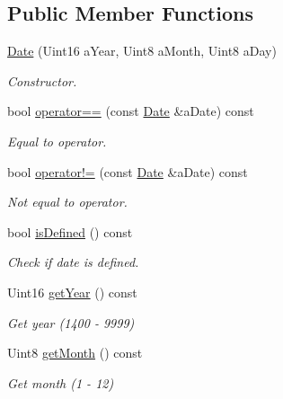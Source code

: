 \subsection*{Public Member Functions}
\begin{DoxyCompactItemize}
\item 
\hyperlink{classostk_1_1physics_1_1time_1_1_date_a3ff43a5f7a8ce8350e894b51befeb50d}{Date} (Uint16 a\+Year, Uint8 a\+Month, Uint8 a\+Day)
\begin{DoxyCompactList}\small\item\em Constructor. \end{DoxyCompactList}\item 
bool \hyperlink{classostk_1_1physics_1_1time_1_1_date_aeb81c9a588fb376cff125b5c7a6c102b}{operator==} (const \hyperlink{classostk_1_1physics_1_1time_1_1_date}{Date} \&a\+Date) const
\begin{DoxyCompactList}\small\item\em Equal to operator. \end{DoxyCompactList}\item 
bool \hyperlink{classostk_1_1physics_1_1time_1_1_date_a556e99ee4d580ef765e67e150193872e}{operator!=} (const \hyperlink{classostk_1_1physics_1_1time_1_1_date}{Date} \&a\+Date) const
\begin{DoxyCompactList}\small\item\em Not equal to operator. \end{DoxyCompactList}\item 
bool \hyperlink{classostk_1_1physics_1_1time_1_1_date_af73384bd32110f0b66214afd79b60b60}{is\+Defined} () const
\begin{DoxyCompactList}\small\item\em Check if date is defined. \end{DoxyCompactList}\item 
Uint16 \hyperlink{classostk_1_1physics_1_1time_1_1_date_ac22f785a79d49e0ffd96e38e73fe94cc}{get\+Year} () const
\begin{DoxyCompactList}\small\item\em Get year (1400 -\/ 9999) \end{DoxyCompactList}\item 
Uint8 \hyperlink{classostk_1_1physics_1_1time_1_1_date_a82987dc8c6a37826cb4810781eb4cff6}{get\+Month} () const
\begin{DoxyCompactList}\small\item\em Get month (1 -\/ 12) \end{DoxyCompactList}\item 

\end{DoxyCompactItemize}
